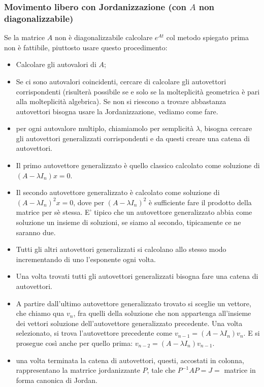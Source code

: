 \begin{landscape}
    \subsubsection*{Movimento libero con Jordanizzazione (con $A$ non diagonalizzabile)}
    Se la matrice $A$ non è diagonalizzabile calcolare $e^{At}$ col metodo spiegato prima non è fattibile, piuttosto usare questo procedimento:
    \begin{itemize}
        \item Calcolare gli autovalori di $A$;
        \item Se ci sono autovalori coincidenti, cercare di calcolare gli autovettori corrispondenti (risulterà possibile se e solo se la molteplicità geometrica è pari alla molteplicità algebrica). Se non si riescono a trovare abbastanza autovettori bisogna usare la Jordanizzazione, vediamo come fare.
        \item per ogni autovalore multiplo, chiamiamolo per semplicità $\lambda$, bisogna cercare gli autovettori generalizzati corrispondenti e da questi creare una catena di autovettori.
        \item Il primo autovettore generalizzato è quello classico calcolato come soluzione di $(A-\lambda I_n) x = 0$.
        \item Il secondo autovettore generalizzato è calcolato come soluzione di $(A-\lambda I_n)^2 x = 0$, dove per $(A-\lambda I_n)^2$ è sufficiente fare il prodotto della matrice per sè stessa. E' tipico che un autovettore generalizzato abbia come soluzione un insieme di soluzioni, se siamo al secondo, tipicamente ce ne saranno due.
        \item Tutti gli altri autovettori generalizzati si calcolano allo stesso modo incrementando di uno l'esponente ogni volta.
        \item Una volta trovati tutti gli autovettori generalizzati bisogna fare una catena di autovettori.
        \item A partire dall'ultimo autovettore generalizzato trovato si sceglie un vettore, che chiamo qua $v_n$, fra quelli della soluzione che non appartenga all'insieme dei vettori soluzione dell'autovettore generalizzato precedente. Una volta selezionato, si trova l'autovettore precedente come $v_{n-1} = (A- \lambda I_n)v_n$. E si prosegue così anche per quello prima: $v_{n-2} = (A-\lambda I_n) v_{n-1}$.
        \item una volta terminata la catena di autovettori, questi, accostati in colonna, rappresentano la matrrice jordanizzante $P$, tale che $P^{-1} A P = J =$ matrice in forma canonica di Jordan.

\end{itemize}
\end{landscape}
